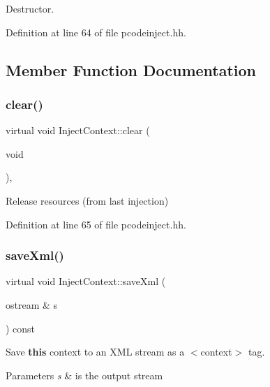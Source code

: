 Destructor. 



Definition at line 64 of file pcodeinject.\+hh.



\subsection{Member Function Documentation}
\mbox{\label{class_inject_context_a0887ab87dff135345185c628daa0fa23}} 
\subsubsection{\texorpdfstring{clear()}{clear()}}
{\footnotesize\ttfamily virtual void Inject\+Context\+::clear (\begin{DoxyParamCaption}\item[{void}]{ }\end{DoxyParamCaption})\hspace{0.3cm}{\ttfamily [inline]}, {\ttfamily [virtual]}}



Release resources (from last injection) 



Definition at line 65 of file pcodeinject.\+hh.

\mbox{\label{class_inject_context_a85884d6d9e18996f0b03aa10a4e11be6}} 
\subsubsection{\texorpdfstring{saveXml()}{saveXml()}}
{\footnotesize\ttfamily virtual void Inject\+Context\+::save\+Xml (\begin{DoxyParamCaption}\item[{ostream \&}]{s }\end{DoxyParamCaption}) const\hspace{0.3cm}{\ttfamily [pure virtual]}}



Save {\bfseries{this}} context to an X\+ML stream as a $<$context$>$ tag. 


\begin{DoxyParams}{Parameters}
{\em s} & is the output stream \\
\hline
\end{DoxyParams}


